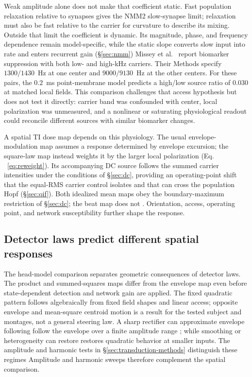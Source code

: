 \documentclass[11pt,a4paper]{article}
\providecommand{\DIFaddtex}[1]{{\protect\color{blue} \sf #1}} %
\providecommand{\DIFdeltex}[1]{{\protect\color{red} \scriptsize #1}} %
\providecommand{\DIFaddbegin}{} %
\providecommand{\DIFaddend}{} %
\providecommand{\DIFdelbegin}{} %
\providecommand{\DIFdelend}{} %
\providecommand{\DIFadd}[1]{\texorpdfstring{\DIFaddtex{#1}}{#1}} %
\providecommand{\DIFdel}[1]{\texorpdfstring{\DIFdeltex{#1}}{}} %
\begin{document}
\DIFdelbegin \DIFdel{Weak amplitude alone does not make that coefficient static. Fast population
relaxation relative to synapses gives the NMM2 slow-synapse limit; relaxation
must also be fast relative to the carrier for curvature to describe its mixing. Outside that limit the
coefficient is dynamic. Its magnitude,
phase, and frequency dependence remain model-specific, while the static slope converts
slow input into rate and enters recurrent gain (\S\ref{sec:nmm})}\DIFdelend \DIFaddbegin \DIFadd{Missey et al.\ \cite{missey2026} report biomarker suppression with both
low- and high-kHz carriers. Their Methods specify $1300/1430$~Hz at one
center and $9000/9130$~Hz at the other centers. For these pairs, the
$0.2$~ms point-membrane model predicts a high/low source ratio of $0.030$
at matched local fields. This comparison challenges that access hypothesis
but does not test it directly: carrier band was confounded with center,
local polarization was unmeasured, and a nonlinear or saturating physiological
readout could reconcile different sources with similar biomarker changes}\DIFaddend .

\DIFdelbegin \DIFdel{A spatial TI dose map depends on this physiology.
The usual envelope-modulation
map assumes a response determined by envelope excursion; the square-law map instead weights it by the larger local polarization (Eq. ~\eqref{eq:reweight}).
Its accompanying DC source follows the summed carrier intensities under the
conditions of \S\ref{sec:dc}, providing an operating-point shift that
the equal-RMS carrier control isolates and that can cross the population Hopf
(\S\ref{sec:qif}).
Both idealized mean maps obey the boundary-maximum restriction of
\S\ref{sec:dc};
the beat map does not .
Orientation, access, operating point, and network susceptibility further shape
the response. }\DIFdelend \DIFaddbegin \subsection{\DIFadd{Detector laws predict different spatial responses}}
\DIFadd{The head-model comparison separates geometric consequences of detector laws.
The product and summed-squares maps differ from the envelope map even before
state-dependent detection and network gain are applied. The fixed quadratic
pattern follows algebraically from fixed field shapes and linear access;
opposite envelope and mean-square centroid motion is a result for the tested
subject and montages, not a general steering law. }\DIFaddend A sharp rectifier can \DIFdelbegin \DIFdel{approximate
envelope following }\DIFdelend \DIFaddbegin \DIFadd{follow
the envelope }\DIFaddend over a finite amplitude range \DIFdelbegin \DIFdel{; }\DIFdelend \DIFaddbegin \DIFadd{while }\DIFaddend smoothing or heterogeneity
\DIFdelbegin \DIFdel{can restore }\DIFdelend \DIFaddbegin \DIFadd{restores }\DIFaddend quadratic behavior at smaller inputs. \DIFdelbegin \DIFdel{The amplitude and harmonic tests in \S\ref{sec:transduction-methods} distinguish these regimes}\DIFdelend \DIFaddbegin \DIFadd{Amplitude and harmonic sweeps
therefore complement the spatial comparison}\DIFaddend .
\end{document}
